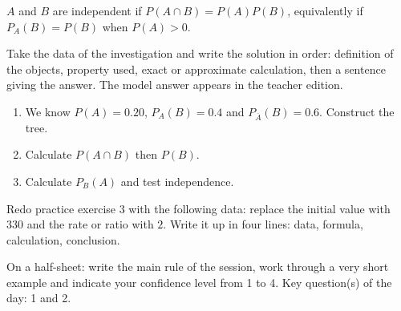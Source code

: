 \begin{traceecrite}$A$ and $B$ are independent if $P(A\cap B)=P(A)P(B)$, equivalently if $P_A(B)=P(B)$ when $P(A)>0$.\end{traceecrite}

\begin{exemple}
Take the data of the investigation and write the solution in order: definition of the objects, property used, exact or approximate calculation, then a sentence giving the answer. The model answer appears in the teacher edition.
\end{exemple}

\begin{exercice}[-- essential]
\begin{enumerate}\item We know $P(A)=0.20$, $P_A(B)=0.4$ and $P_{\overline A}(B)=0.6$. Construct the tree.\item Calculate $P(A\cap B)$ then $P(B)$.\item Calculate $P_B(A)$ and test independence.\end{enumerate}
\end{exercice}


\begin{dm}Redo practice exercise 3 with the following data: replace the initial value with $330$ and the rate or ratio with $2$. Write it up in four lines: data, formula, calculation, conclusion.\end{dm}

\begin{sortie}On a half-sheet: write the main rule of the session, work through a very short example and indicate your confidence level from 1 to 4. Key question(s) of the day: 1 and 2.\end{sortie}

